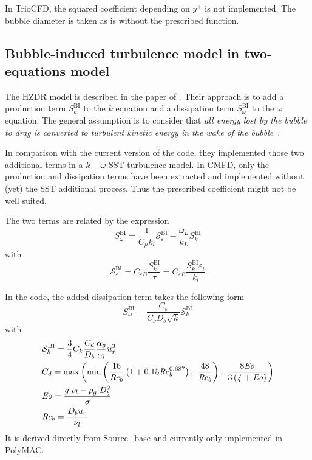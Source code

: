 In TrioCFD, the squared coefficient depending on $y^+$ is not implemented. The bubble diameter is taken as is without the prescribed function.

\subsection{Bubble-induced turbulence model in two-equations model}

The HZDR model is described in the paper of \cite{Rzehak2013a,Rzehak2013b,Rzehak2015,Colombo2021}. Their approach is to add a production term $S_{k}^{\text{BI}}$ to the $k$ equation and a dissipation term $S_{\omega}^{\text{BI}}$ to the $\omega$ equation. The general assumption is to consider that \emph{all energy lost by the bubble to drag is converted to turbulent kinetic energy in the wake of the bubble}~\cite{Rzehak2013b}.

In comparison with the current version of the code, they implemented those two additional terms in a $k-\omega$ SST turbulence model. In CMFD, only the production and dissipation terms have been extracted and implemented without (yet) the SST additional process. Thus the prescribed coefficient might not be well suited.

The two terms are related by the expression
\begin{equation}
    S_{\omega}^{\text{BI}} = \frac{1}{C_{\mu} k_l} \mathcal{S}_{\varepsilon}^{\text{BI}} - \frac{\omega_L}{k_L}S_{k}^{\text{BI}}
\end{equation}
with
\begin{equation}
    \mathcal{S}_{\varepsilon}^{\text{BI}} = C_{\varepsilon B}\frac{S_{k}^{\text{BI}}}{\tau} = C_{\varepsilon B}\frac{S_{k}^{\text{BI}}\varepsilon_l}{k_l}
\end{equation}


In the code, the added dissipation term takes the following form
\begin{equation}
    S_{\omega}^{\text{BI}} = \frac{C_{\varepsilon}}{C_{\nu}D_b\sqrt{k}}\mathcal{S}_{k}^{\text{BI}}
\end{equation}
with
\begin{align}
    &\mathcal{S}_{k}^{\text{BI}} = \frac{3}{4}C_k\frac{C_d}{D_b}\frac{\alpha_g}{\alpha_l}u_r^3\\
    &C_d = \max\parent{\min\parent{\frac{16}{\mathit{Re}_b}\parent{1+0.15\mathit{Re}_b^{0.687}},\ \frac{48}{\mathit{Re}_b}},\ \frac{8\mathit{Eo}}{3\parent{\mathit{4+Eo}}}}\\
    &\mathit{Eo} = \frac{g\norm{\rho_l - \rho_g}D_b^2}{\sigma}\\
    &\mathit{Re}_b = \frac{D_b u_r}{\nu_l}
\end{align}
It is derived directly from Source_base and currently only implemented in PolyMAC.

